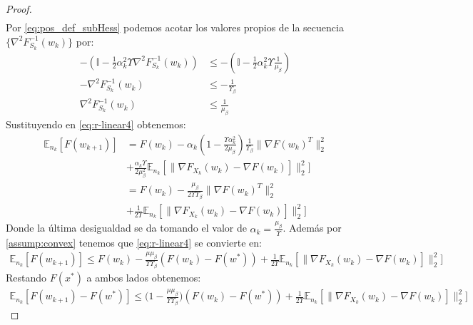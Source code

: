 \documentclass{book}
\theoremstyle{plain}
\theoremstyle{definition}
\theoremstyle{remark}
\begin{document}
\begin{proof}
\begin{equation}
\begin{split}
\end{split}
\end{equation}
Por \ref{eq:pos_def_subHess} podemos acotar los valores propios de la secuencia $\{\nabla^2F_{S_k}^{-1}(w_k)\}$ por:
\begin{equation*}
\begin{split}
    -(\mathbb{I}-\frac{1}{2}\alpha^2_k\Upsilon\nabla^2F_{S_k}^{-1}(w_k)) & \leq -(\mathbb{I}-\frac{1}{2}\alpha^2_k\Upsilon\frac{1}{\mu_\beta}) \\
    - \nabla^2F_{S_k}^{-1}(w_k) & \leq -\frac{1}{\Upsilon_\beta}\\
      \nabla^2F_{S_k}^{-1}(w_k) & \leq \frac{1}{\mu_\beta}
\end{split}
\end{equation*}
Sustituyendo en \ref{eq:r-linear4} obtenemos:
\begin{equation}
\begin{split}
     \mathbb{E}_{n_k}[F(w_{k+1})] & =F(w_{k}) -\alpha_k(1-\frac{\Upsilon\alpha^2_k}{2\mu_\beta})\frac{1}{\Upsilon_\beta}\|\nabla F(w_{k})^T\|_2^2\\ & + \frac{\alpha_k\Upsilon}{2\mu_\beta^2}\mathbb{E}_{n_k}[\|\nabla F_{X_k}(w_k) - \nabla F(w_k)]\|_2^2]\\
     & =F(w_{k}) -\frac{\mu_\beta}{2\Upsilon\Upsilon_\beta}\|\nabla F(w_{k})^T\|_2^2\\ & + \frac{1}{2\Upsilon}\mathbb{E}_{n_k}[\|\nabla F_{X_k}(w_k) - \nabla F(w_k)]\|_2^2]
\end{split}
\end{equation}
Donde la última desigualdad se da tomando el valor de $\alpha_k = \frac{\mu_\beta}{\Upsilon}$. Además por  \ref{assump:convex} tenemos que  \ref{eq:r-linear4} se convierte en:
\begin{equation*}
    \begin{split}
        \mathbb{E}_{n_k}[F(w_{k+1})] \leq F(w_{k}) -\frac{\mu\mu_\beta}{\Upsilon\Upsilon_\beta}(F(w_k) - F(w^*))+ \frac{1}{2\Upsilon}\mathbb{E}_{n_k}[\|\nabla F_{X_k}(w_k) - \nabla F(w_k)]\|_2^2]
    \end{split}
\end{equation*}
Restando $F(x^*)$ a ambos lados obtenemos:
\begin{equation}\label{eq:r-linear5}
    \begin{split}
        \mathbb{E}_{n_k}[F(w_{k+1})- F(w^*)] \leq\bigg(1 -\frac{\mu\mu_\beta}{\Upsilon\Upsilon_\beta}\bigg)(F(w_k) - F(w^*))+ \frac{1}{2\Upsilon}\mathbb{E}_{n_k}[\|\nabla F_{X_k}(w_k) - \nabla F(w_k)]\|_2^2]
    \end{split}

\end{equation}
\end{proof}
\end{document}
